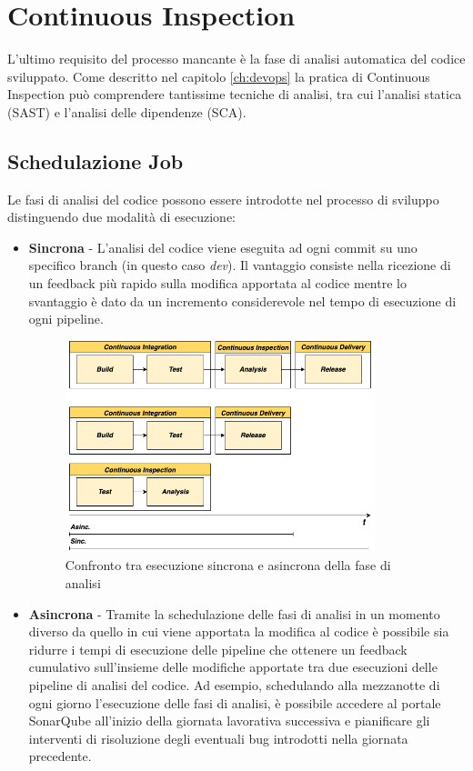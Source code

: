 \section{Continuous Inspection}
L'ultimo requisito del processo mancante è la fase di analisi automatica del codice sviluppato. Come descritto nel capitolo \ref{ch:devops} la pratica di Continuous Inspection può comprendere tantissime tecniche di analisi, tra cui l'analisi statica (SAST) e l'analisi delle dipendenze (SCA).

\subsection{Schedulazione Job}
Le fasi di analisi del codice possono essere introdotte nel processo di sviluppo distinguendo due modalità di esecuzione:

\begin{itemize}
    \item \textbf{Sincrona} - L'analisi del codice viene eseguita ad ogni commit su uno specifico branch (in questo caso \textit{dev}). Il vantaggio consiste nella ricezione di un feedback più rapido sulla modifica apportata al codice mentre lo svantaggio è dato da un incremento considerevole nel tempo di esecuzione di ogni pipeline.
    
    \begin{figure}[H]
        \centering
        \includegraphics[width=0.85\textwidth]{img/inspection-sync-async.png}
        \caption{Confronto tra esecuzione sincrona e asincrona della fase di analisi}
        \label{inspection-sync-async}
    \end{figure}
    
    \item \textbf{Asincrona} - Tramite la schedulazione delle fasi di analisi in un momento diverso da quello in cui viene apportata la modifica al codice è possibile sia ridurre i tempi di esecuzione delle pipeline che ottenere un feedback cumulativo sull'insieme delle modifiche apportate tra due esecuzioni delle pipeline di analisi del codice. Ad esempio, schedulando alla mezzanotte di ogni giorno l'esecuzione delle fasi di analisi, è possibile accedere al portale SonarQube all'inizio della giornata lavorativa successiva e pianificare gli interventi di risoluzione degli eventuali bug introdotti nella giornata precedente.
\end{itemize}


